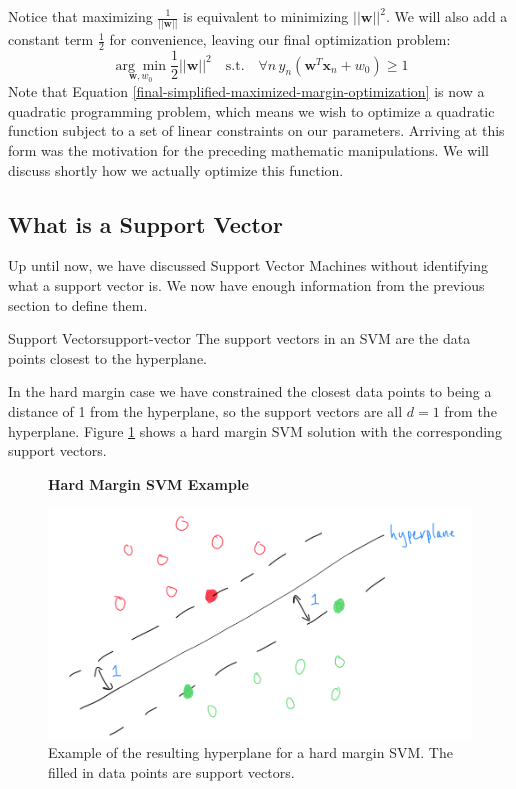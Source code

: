 Notice that maximizing $\frac{1}{||\textbf{w}||}$ is equivalent to minimizing $||\textbf{w}||^{2}$. We will also add a constant term $\frac{1}{2}$ for convenience, leaving our final optimization problem:
\begin{equation} \label{final-simplified-maximized-margin-optimization}
	\underset{\textbf{w}, w_{0}}{\arg\min} \frac{1}{2} ||\textbf{w}||^{2} \quad \text{s.t.} \quad \forall n \, y_{n}(\textbf{w}^{T}\textbf{x}_{n} + w_{0}) \geq 1
\end{equation}
Note that Equation \ref{final-simplified-maximized-margin-optimization} is now a quadratic programming problem, which means we wish to optimize a quadratic function subject to a set of linear constraints on our parameters. Arriving at this form was the motivation for the preceding mathematic manipulations. We will discuss shortly how we actually optimize this function.

\subsection{What is a Support Vector}
Up until now, we have discussed Support Vector Machines without identifying what a support vector is. We now have enough information from the previous section to define them.

\begin{definition}{Support Vector}{support-vector}
The support vectors in an SVM are the data points closest to the hyperplane.
\end{definition}

In the hard margin case we have constrained the closest data points to being a distance of 1 from the hyperplane, so the support vectors are all $d=1$ from the hyperplane. Figure \ref{fig:hard-margin-svm} shows a hard margin SVM solution with the corresponding support vectors.


\begin{figure}
    \centering
    \textbf{Hard Margin SVM Example}\par\medskip
    \includegraphics[width=0.5\paperwidth]{../SupportVectorMachines/fig/hard-margin-svm.png}
    \caption{Example of the resulting hyperplane for a hard margin SVM. The filled in data points are support vectors.}
    \label{fig:hard-margin-svm}
\end{figure}

